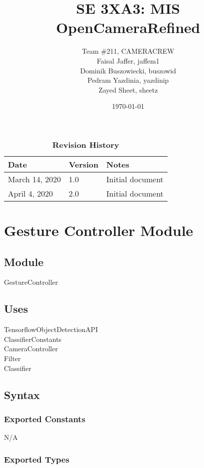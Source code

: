 \documentclass[12pt, titlepage]{article}
\title{SE 3XA3: MIS\\OpenCameraRefined}
\author{Team \#211, CAMERACREW
		\\ Faisal Jaffer, jaffem1
		\\ Dominik Buszowiecki, buszowid
		\\ Pedram Yazdinia, yazdinip
		\\ Zayed Sheet, sheetz
}
\date{\today}
\begin{document}
\maketitle


\begin{table}[hp]
\caption{\bf Revision History}
\begin{tabularx}{\textwidth}{p{3cm}p{2cm}X}
\toprule {\bf Date} & {\bf Version} & {\bf Notes}\\
\midrule
March 14, 2020 & 1.0 & Initial document\\
\midrule
April 4, 2020 & 2.0 & Initial document\\
\bottomrule
\end{tabularx}
\end{table}

\newpage

\section* {Gesture Controller Module}

\subsection*{Module}

GestureController

\subsection* {Uses}

TensorflowObjectDetectionAPI \\
ClassifierConstants \\
CameraController \\
Filter \\
Classifier

\subsection* {Syntax}

\subsubsection* {Exported Constants}

N/A

\subsubsection* {Exported Types}
\end{document}

